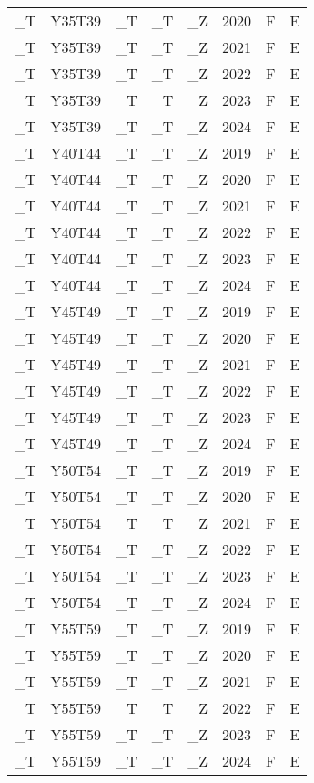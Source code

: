 \begin{longtable}[t]{llllllll}
\_T & Y35T39 & \_T & \_T & \_Z & 2020 & F & E\\
\addlinespace
\_T & Y35T39 & \_T & \_T & \_Z & 2021 & F & E\\
\_T & Y35T39 & \_T & \_T & \_Z & 2022 & F & E\\
\_T & Y35T39 & \_T & \_T & \_Z & 2023 & F & E\\
\_T & Y35T39 & \_T & \_T & \_Z & 2024 & F & E\\
\_T & Y40T44 & \_T & \_T & \_Z & 2019 & F & E\\
\addlinespace
\_T & Y40T44 & \_T & \_T & \_Z & 2020 & F & E\\
\_T & Y40T44 & \_T & \_T & \_Z & 2021 & F & E\\
\_T & Y40T44 & \_T & \_T & \_Z & 2022 & F & E\\
\_T & Y40T44 & \_T & \_T & \_Z & 2023 & F & E\\
\_T & Y40T44 & \_T & \_T & \_Z & 2024 & F & E\\
\addlinespace
\_T & Y45T49 & \_T & \_T & \_Z & 2019 & F & E\\
\_T & Y45T49 & \_T & \_T & \_Z & 2020 & F & E\\
\_T & Y45T49 & \_T & \_T & \_Z & 2021 & F & E\\
\_T & Y45T49 & \_T & \_T & \_Z & 2022 & F & E\\
\_T & Y45T49 & \_T & \_T & \_Z & 2023 & F & E\\
\addlinespace
\_T & Y45T49 & \_T & \_T & \_Z & 2024 & F & E\\
\_T & Y50T54 & \_T & \_T & \_Z & 2019 & F & E\\
\_T & Y50T54 & \_T & \_T & \_Z & 2020 & F & E\\
\_T & Y50T54 & \_T & \_T & \_Z & 2021 & F & E\\
\_T & Y50T54 & \_T & \_T & \_Z & 2022 & F & E\\
\addlinespace
\_T & Y50T54 & \_T & \_T & \_Z & 2023 & F & E\\
\_T & Y50T54 & \_T & \_T & \_Z & 2024 & F & E\\
\_T & Y55T59 & \_T & \_T & \_Z & 2019 & F & E\\
\_T & Y55T59 & \_T & \_T & \_Z & 2020 & F & E\\
\_T & Y55T59 & \_T & \_T & \_Z & 2021 & F & E\\
\addlinespace
\_T & Y55T59 & \_T & \_T & \_Z & 2022 & F & E\\
\_T & Y55T59 & \_T & \_T & \_Z & 2023 & F & E\\
\_T & Y55T59 & \_T & \_T & \_Z & 2024 & F & E\\

\end{longtable}
